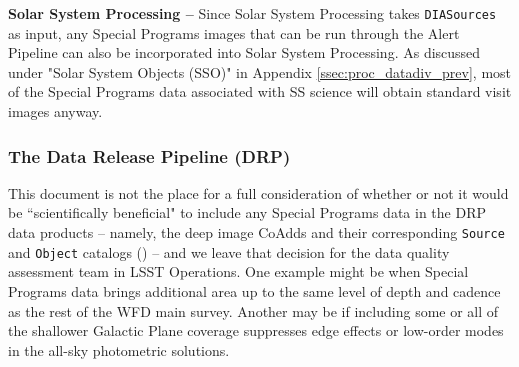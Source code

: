 \documentclass[DM,lsstdoc,toc]{lsstdoc}
\begin{document}


{\bf Solar System Processing -- } Since Solar System Processing takes \texttt{DIASources} as input, any Special Programs images that can be run through the Alert Pipeline can also be incorporated into Solar System Processing.
As discussed under "Solar System Objects (SSO)" in Appendix \ref{ssec:proc_datadiv_prev}, most of the Special Programs data associated with SS science will obtain standard visit images anyway.

\subsubsection{The Data Release Pipeline (DRP)}\label{ssec:dmplans_drp}

This document is not the place for a full consideration of whether or not it would be ``scientifically beneficial" to include any Special Programs data in the DRP data products -- namely, the deep image CoAdds and their corresponding {\tt Source} and {\tt Object} catalogs () -- and we leave that decision for the data quality assessment team in LSST Operations. One example might be when Special Programs data brings additional area up to the same level of depth and cadence as the rest of the WFD main survey. Another may be if including some or all of the shallower Galactic Plane coverage suppresses edge effects or low-order modes in the all-sky photometric solutions.
\end{document}
